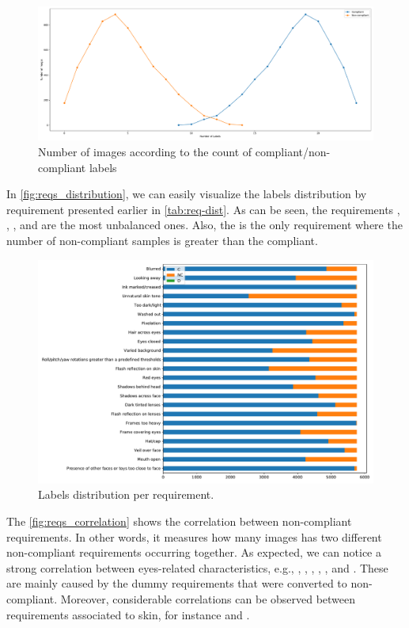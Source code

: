 \begin{figure}
    \centering
    \includegraphics[width=\linewidth]{images/labels_by_sample.pdf}
    \caption{Number of images according to the count of compliant/non-compliant labels}
    \label{fig:labels_by_sample}
\end{figure}

In \autoref{fig:reqs_distribution}, we can easily visualize the labels distribution by requirement presented earlier in \autoref{tab:req-dist}. As can be seen, the requirements \citeReq{\inkmarked}, \citeReq{\washedout}, \citeReq{\framestooheavy}, and \citeReq{\otherfacesortoys} are the most unbalanced ones. Also, the \citeReq{\unnaturalskintone} is the only requirement where the number of non-compliant samples is greater than the compliant.

\begin{figure}
    \centering
    \includegraphics[width=\linewidth]{images/reqs_distribution.pdf}
    \caption{Labels distribution per requirement.}
    \label{fig:reqs_distribution}
\end{figure}

The \autoref{fig:reqs_correlation} shows the correlation between non-compliant requirements. In other words, it measures how many images has two different non-compliant requirements occurring together. As expected, we can notice a strong correlation between eyes-related characteristics, e.g., \citeReq{\lookingaway}, \citeReq{\hairacrosseyes}, \citeReq{\eyesclosed}, \citeReq{\redeyes}, \citeReq{\darktintedlenses}, and \citeReq{\framecoveringeyes}. These are mainly caused by the dummy requirements that were converted to non-compliant. Moreover, considerable correlations can be observed between requirements associated to skin, for instance \citeReq{\unnaturalskintone} and \citeReq{\flashskin}. 

